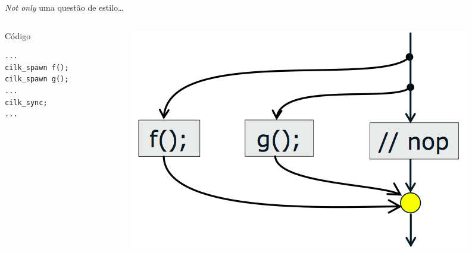 \documentclass{beamer}
\begin{document}
\begin{frame}[fragile]{\emph{Not only} uma questão de estilo\ldots}
\begin{columns}[c]

\begin{column}{0.3\textwidth}
\begin{block}{Código}
\begin{lstlisting}
...
cilk_spawn f();
cilk_spawn g();
...
cilk_sync;
...
\end{lstlisting}
\end{block}
\end{column}

\pause

\begin{column}{0.6\textwidth}
\begin{figure}
\centering
\includegraphics[width=\columnwidth]{./img/bad-style.png}
\end{figure}
\end{column}
\end{columns}
\end{frame}
\end{document}
